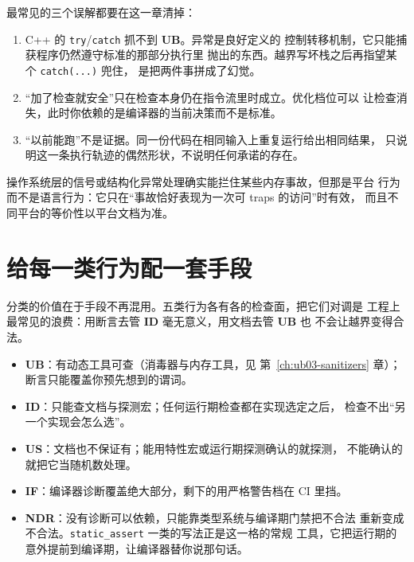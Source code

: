 \documentclass[12pt,a4paper,fontset=fandol]{ctexbook}
\newcommand{\Tp}[1]{\texttt{#1}}
\newcommand{\Lang}[1]{\textsf{#1}}
\newcommand{\CPP}{\Lang{C++}}
\newcommand{\UB}{\textbf{\textsf{UB}}}
\newcommand{\IDB}{\textbf{\textsf{ID}}}
\newcommand{\USB}{\textbf{\textsf{US}}}
\newcommand{\NDR}{\textbf{\textsf{NDR}}}
\newcommand{\ILLF}{\textbf{\textsf{IF}}}
\begin{document}
\begin{warning}[title={把 UB 当可捕获的错误是范畴错误}]
最常见的三个误解都要在这一章清掉：

\begin{enumerate}
  \item \CPP{} 的 \Tp{try}/\Tp{catch} 抓不到 \UB{}。异常是良好定义的
        控制转移机制，它只能捕获程序仍然遵守标准的那部分执行里
        抛出的东西。越界写坏栈之后再指望某个 \Tp{catch(...)} 兜住，
        是把两件事拼成了幻觉。
  \item “加了检查就安全”只在检查本身仍在指令流里时成立。优化档位可以
        让检查消失，此时你依赖的是编译器的当前决策而不是标准。
  \item “以前能跑”不是证据。同一份代码在相同输入上重复运行给出相同结果，
        只说明这一条执行轨迹的偶然形状，不说明任何承诺的存在。
\end{enumerate}

操作系统层的信号或结构化异常处理确实能拦住某些内存事故，但那是平台
行为而不是语言行为：它只在“事故恰好表现为一次可 traps 的访问”时有效，
而且不同平台的等价性以平台文档为准。
\end{warning}

\section{给每一类行为配一套手段}\label{sec:ub01-means}

分类的价值在于手段不再混用。五类行为各有各的检查面，把它们对调是
工程上最常见的浪费：用断言去管 \IDB{} 毫无意义，用文档去管 \UB{} 也
不会让越界变得合法。

\begin{compare}[title={类别与可用检查面的对应}]
\begin{itemize}
  \item \UB{}：有动态工具可查（消毒器与内存工具，见
        第~\ref{ch:ub03-sanitizers} 章）；断言只能覆盖你预先想到的谓词。
  \item \IDB{}：只能查文档与探测宏；任何运行期检查都在实现选定之后，
        检查不出“另一个实现会怎么选”。
  \item \USB{}：文档也不保证有；能用特性宏或运行期探测确认的就探测，
        不能确认的就把它当随机数处理。
  \item \ILLF{}：编译器诊断覆盖绝大部分，剩下的用严格警告档在 CI 里挡。
  \item \NDR{}：没有诊断可以依赖，只能靠类型系统与编译期门禁把不合法
        重新变成不合法。\Tp{static\_assert} 一类的写法正是这一格的常规
        工具，它把运行期的意外提前到编译期，让编译器替你说那句话。
\end{itemize}
\end{compare}
\end{document}
